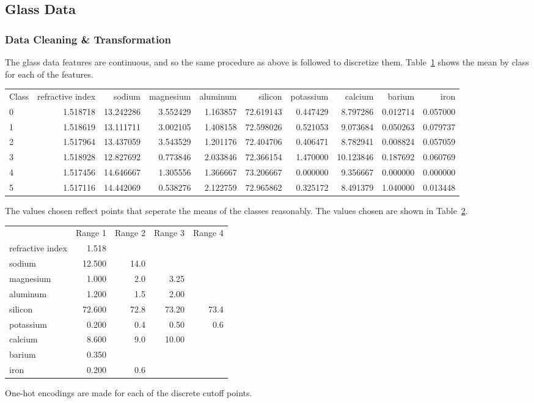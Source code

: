 \documentclass{amsart}
\begin{document}
\subsection{Glass Data}
\subsubsection*{Data Cleaning \& Transformation}
The glass data features are continuous, and so the same procedure as above is followed to discretize them.
Table~\ref{glassmeans} shows the mean by class for each of the features.
\begin{table}
\begin{tabular}{lrrrrrrrrr}
Class &  refractive index &     sodium &  magnesium &  aluminum &    silicon &  potassium &    calcium &    barium &      iron \\
0 &          1.518718 &  13.242286 &   3.552429 &  1.163857 &  72.619143 &   0.447429 &   8.797286 &  0.012714 &  0.057000 \\
1 &          1.518619 &  13.111711 &   3.002105 &  1.408158 &  72.598026 &   0.521053 &   9.073684 &  0.050263 &  0.079737 \\
2 &          1.517964 &  13.437059 &   3.543529 &  1.201176 &  72.404706 &   0.406471 &   8.782941 &  0.008824 &  0.057059 \\
3 &          1.518928 &  12.827692 &   0.773846 &  2.033846 &  72.366154 &   1.470000 &  10.123846 &  0.187692 &  0.060769 \\
4 &          1.517456 &  14.646667 &   1.305556 &  1.366667 &  73.206667 &   0.000000 &   9.356667 &  0.000000 &  0.000000 \\
5 &          1.517116 &  14.442069 &   0.538276 &  2.122759 &  72.965862 &   0.325172 &   8.491379 &  1.040000 &  0.013448
\end{tabular}
\label{glassmeans}
\end{table}
The values chosen reflect points that seperate the means of the classes reasonably. The values chosen are shown in Table~\ref{glass_discrete}.
\begin{table}
\begin{tabular}{lrrrr}
{} &       Range 1 &     Range 2 &      Range 3 &     Range 4 \\
refractive index &   1.518 &   {} &    {} &   {} \\
sodium           &  12.500 &  14.0 &    {} &   {} \\
magnesium        &   1.000 &   2.0 &   3.25 &   {} \\
aluminum         &   1.200 &   1.5 &   2.00 &   {} \\
silicon          &  72.600 &  72.8 &  73.20 &  73.4 \\
potassium        &   0.200 &   0.4 &   0.50 &   0.6 \\
calcium          &   8.600 &   9.0 &  10.00 &   {} \\
barium           &   0.350 &   {} &    {} &   {} \\
iron             &   0.200 &   0.6 &    {} &   {} \\
\end{tabular}
\label{glass_discrete}
\end{table}
One-hot encodings are made for each of the discrete cutoff points.
\end{document}
